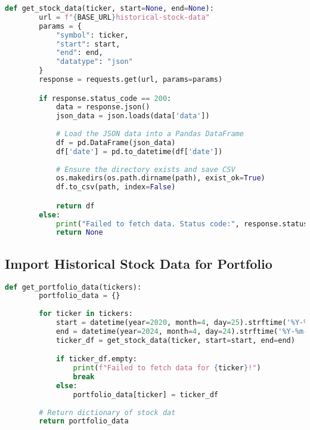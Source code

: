 \documentclass{article}
\begin{document}
\begin{lstlisting}[language=Python]
    def get_stock_data(ticker, start=None, end=None):    
        url = f"{BASE_URL}historical-stock-data"
        params = {
            "symbol": ticker,
            "start": start,
            "end": end,
            "datatype": "json"
        }
        response = requests.get(url, params=params)

        if response.status_code == 200:
            data = response.json()  
            json_data = json.loads(data['data'])
        
            # Load the JSON data into a Pandas DataFrame
            df = pd.DataFrame(json_data) 
            df['date'] = pd.to_datetime(df['date'])
            
            # Ensure the directory exists and save CSV
            os.makedirs(os.path.dirname(path), exist_ok=True)
            df.to_csv(path, index=False)

            return df
        else:
            print("Failed to fetch data. Status code:", response.status_code)
            return None
\end{lstlisting}

\subsection{Import Historical Stock Data for Portfolio}

\begin{lstlisting}[language=Python]
    def get_portfolio_data(tickers):
        portfolio_data = {}
        
        for ticker in tickers:
            start = datetime(year=2020, month=4, day=25).strftime('%Y-%m-%d')
            end = datetime(year=2024, month=4, day=24).strftime('%Y-%m-%d')
            ticker_df = get_stock_data(ticker, start=start, end=end)

            if ticker_df.empty:
                print(f"Failed to fetch data for {ticker}!")
                break
            else:
                portfolio_data[ticker] = ticker_df
        
        # Return dictionary of stock dat 
        return portfolio_data
\end{lstlisting}
\end{document}
